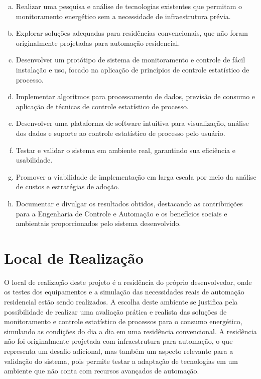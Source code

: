 \begin{enumerate}[a)]
\item Realizar uma pesquisa e análise de tecnologias existentes que permitam o monitoramento energético sem a necessidade de infraestrutura prévia.
\item Explorar soluções adequadas para residências convencionais, que não foram originalmente projetadas para automação residencial.
\item Desenvolver um protótipo de sistema de monitoramento e controle de fácil instalação e uso, focado na aplicação de princípios de controle estatístico de processo.
\item Implementar algoritmos para processamento de dados, previsão de consumo e aplicação de técnicas de controle estatístico de processo.
\item Desenvolver uma plataforma de software intuitiva para visualização, análise dos dados e suporte ao controle estatístico de processo pelo usuário.
\item Testar e validar o sistema em ambiente real, garantindo sua eficiência e usabilidade.
\item Promover a viabilidade de implementação em larga escala por meio da análise de custos e estratégias de adoção.
\item Documentar e divulgar os resultados obtidos, destacando as contribuições para a Engenharia de Controle e Automação e os benefícios sociais e ambientais proporcionados pelo sistema desenvolvido.
\end{enumerate}

\section{Local de Realização}
\label{sec:empresa}

O local de realização deste projeto é a residência do próprio desenvolvedor, onde os testes dos equipamentos e a simulação das necessidades reais de automação residencial estão sendo realizados. A escolha deste ambiente se justifica pela possibilidade de realizar uma avaliação prática e realista das soluções de monitoramento e controle estatístico de processos para o consumo energético, simulando as condições do dia a dia em uma residência convencional. A residência não foi originalmente projetada com infraestrutura para automação, o que representa um desafio adicional, mas também um aspecto relevante para a validação do sistema, pois permite testar a adaptação de tecnologias em um ambiente que não conta com recursos avançados de automação.

